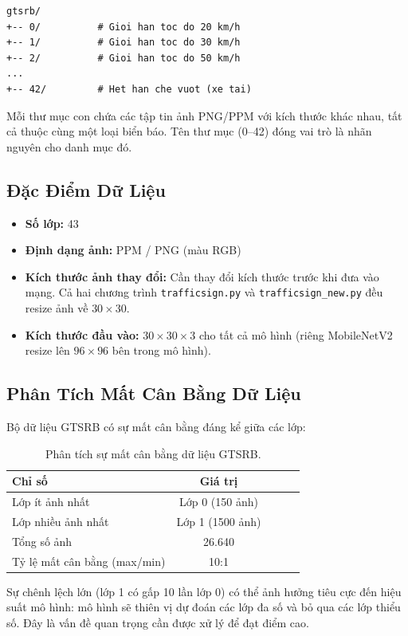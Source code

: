 \documentclass[12pt,a4paper]{article}
\begin{document}
\begin{verbatim}
gtsrb/
+-- 0/          # Gioi han toc do 20 km/h
+-- 1/          # Gioi han toc do 30 km/h
+-- 2/          # Gioi han toc do 50 km/h
...
+-- 42/         # Het han che vuot (xe tai)
\end{verbatim}

Mỗi thư mục con chứa các tập tin ảnh PNG/PPM với kích thước khác nhau, tất cả thuộc cùng một loại biển báo. Tên thư mục (0--42) đóng vai trò là nhãn nguyên cho danh mục đó.

\subsection{Đặc Điểm Dữ Liệu}
\begin{itemize}
    \item \textbf{Số lớp:} 43
    \item \textbf{Định dạng ảnh:} PPM / PNG (màu RGB)
    \item \textbf{Kích thước ảnh thay đổi:} Cần thay đổi kích thước trước khi đưa vào mạng. Cả hai chương trình \texttt{trafficsign.py} và \texttt{trafficsign\_new.py} đều resize ảnh về $30 \times 30$.
    \item \textbf{Kích thước đầu vào:} $30 \times 30 \times 3$ cho tất cả mô hình (riêng MobileNetV2 resize lên $96 \times 96$ bên trong mô hình).
\end{itemize}

\subsection{Phân Tích Mất Cân Bằng Dữ Liệu}
Bộ dữ liệu GTSRB có sự mất cân bằng đáng kể giữa các lớp:

\begin{table}[H]
\centering
\begin{tabular}{@{}lcccc@{}}
\toprule
\textbf{Chỉ số} & \textbf{Giá trị} \\ \midrule
Lớp ít ảnh nhất   & Lớp 0 (150 ảnh) \\
Lớp nhiều ảnh nhất & Lớp 1 (1500 ảnh) \\
Tổng số ảnh       & 26.640 \\
Tỷ lệ mất cân bằng (max/min) & 10:1 \\ \bottomrule
\end{tabular}
\caption{Phân tích sự mất cân bằng dữ liệu GTSRB.}
\label{tab:imbalance}
\end{table}

Sự chênh lệch lớn (lớp 1 có gấp 10 lần lớp 0) có thể ảnh hưởng tiêu cực đến hiệu suất mô hình: mô hình sẽ thiên vị dự đoán các lớp đa số và bỏ qua các lớp thiểu số. Đây là vấn đề quan trọng cần được xử lý để đạt điểm cao.
\end{document}
